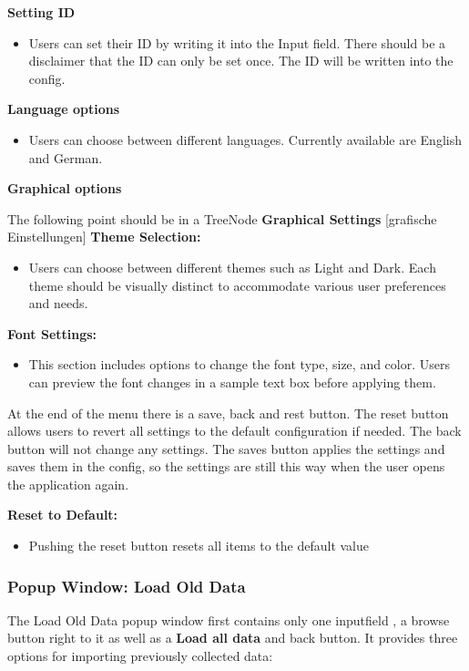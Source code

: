 \documentclass[]{scrreprt}
\begin{document}
\textbf{Setting ID}
\begin{itemize}
    \item Users can set their ID by writing it into the Input field. There should be a disclaimer that the ID can only be set once. 
    The ID will be written into the config. 
\end{itemize}

\textbf{Language options}
\begin{itemize}
  \item  Users can choose between different languages. Currently available are English and German. 
\end{itemize}

\textbf{Graphical options}

The following point should be in a TreeNode \textbf{Graphical Settings} [grafische Einstellungen]
\textbf{Theme Selection:}
\begin{itemize}
    \item Users can choose between different themes such as Light and Dark. Each theme should be visually distinct to accommodate various user preferences and needs.
\end{itemize}

\textbf{Font Settings:}
\begin{itemize}
    \item This section includes options to change the font type, size, and color. Users can preview the font changes in a sample text box before applying them.
\end{itemize}

At the end of the menu there is a save, back and rest button. The reset button allows users to revert all settings to the default configuration if needed. The back button will not change any settings.
The saves button applies the settings and saves them in the config, so the settings are still this way when the user opens the application again. 

\textbf{Reset to Default:}
\begin{itemize}
    \item Pushing the reset button resets all items to the default value 
\end{itemize}

\subsubsection{Popup Window: Load Old Data} \label{cap:PopupWindow_loadoldata}

The Load Old Data popup window first contains only one inputfield , a browse button right to it as well as a \textbf{Load all data} and back button. 
It provides three options for importing previously collected data:
\end{document}
